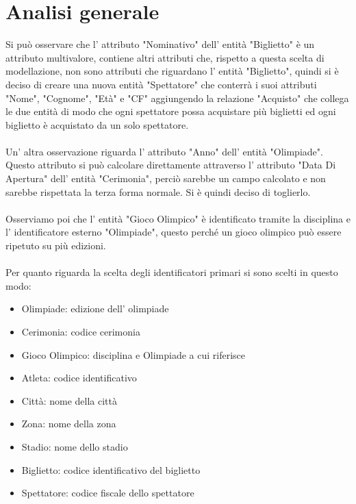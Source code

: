 \documentclass[paper=a4, fontsize=12 pt]{scrartcl} %
\begin{document}
	
	
	\newpage
	\section{Analisi generale}
	
	
	Si può osservare che l' attributo "Nominativo" dell' entità "Biglietto" è un attributo multivalore, contiene altri attributi che, rispetto a questa scelta di modellazione, non sono attributi che riguardano l' entità "Biglietto", quindi si è deciso di creare una nuova entità "Spettatore" che conterrà i suoi attributi "Nome", "Cognome", "Età" e "CF" aggiungendo la relazione "Acquisto" che collega le due entità di modo che ogni spettatore possa acquistare più biglietti ed ogni biglietto è acquistato da un solo spettatore.\\\\
	Un' altra osservazione riguarda l' attributo "Anno" dell' entità "Olimpiade". Questo attributo si può calcolare direttamente attraverso l' attributo "Data Di Apertura" dell' entità "Cerimonia", perciò sarebbe un campo calcolato e non sarebbe rispettata la terza forma normale. Si è quindi deciso di toglierlo.\\\\
	Osserviamo poi che l' entità "Gioco Olimpico" è identificato tramite la disciplina e l' identificatore esterno "Olimpiade", questo perché un gioco olimpico può essere ripetuto su più edizioni. \\\\
	Per quanto riguarda la scelta degli identificatori primari si sono scelti in questo modo:
	\begin{itemize}
		\item Olimpiade: edizione dell' olimpiade
		\item Cerimonia: codice cerimonia
		\item Gioco Olimpico: disciplina e Olimpiade a cui riferisce
		\item Atleta: codice identificativo
		\item Città: nome della città
		\item Zona: nome della zona
		\item Stadio: nome dello stadio
		\item Biglietto: codice identificativo del biglietto
		\item Spettatore: codice fiscale dello spettatore\\
	\end{itemize}
	
\end{document}
